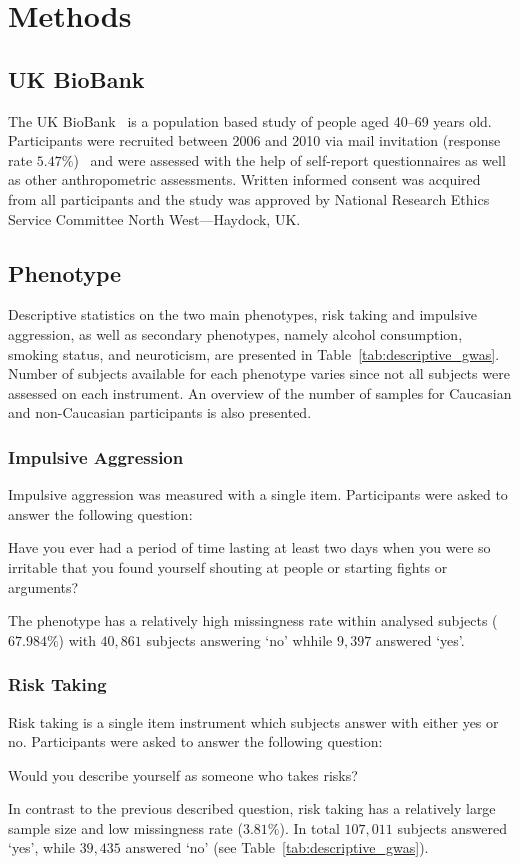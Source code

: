 \section{Methods}
\label{sec:methods}

\subsection{UK BioBank}
\label{sub:uk_biobank}
The UK BioBank~\cite{Allen2014} is a population based study of people aged 40--69 years old. 
Participants were recruited between 2006 and 2010 via mail invitation (response rate $5.47\%$)~\cite{Sudlow2015} and were assessed with the help of self-report questionnaires as well as other anthropometric assessments.
Written informed consent was acquired from all participants and the study was approved by National Research Ethics Service Committee North West---Haydock, UK\@.

\subsection{Phenotype}
\label{sub:phenotype}

Descriptive statistics on the two main phenotypes, risk taking and impulsive aggression,
as well as secondary phenotypes, namely alcohol consumption, smoking status, and neuroticism, are presented in Table~\ref{tab:descriptive_gwas}.  
Number of subjects available for each phenotype varies since not all subjects were assessed on each instrument.
An overview of the number of samples for Caucasian and non-Caucasian participants is also presented.

\subsubsection{Impulsive Aggression}
\label{ssub:impulsive_aggression}
Impulsive aggression was measured with a single item.
Participants were asked to answer the following question:
\begin{displayquote}
  Have you ever had a period of time lasting at least two days when you were so irritable that you found yourself shouting at people or starting fights or arguments?
\end{displayquote}
The phenotype has a relatively high missingness rate within analysed subjects ($67.984\%$) with $40,861$ subjects answering `no' whhile $9,397$ answered `yes'.

\subsubsection{Risk Taking}
\label{ssub:risk_taking}
Risk taking is a single item instrument which subjects answer with either yes or no.
Participants were asked to answer the following question:
\begin{displayquote}
  Would you describe yourself as someone who takes risks?
\end{displayquote}
In contrast to the previous described question, risk taking has a relatively large sample size and low missingness rate ($3.81\%$).
In total $107,011$ subjects answered `yes', while $39,435$ answered `no' (see Table~\ref{tab:descriptive_gwas}).

